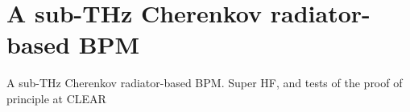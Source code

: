 \chapter[A sub-THz Cherenkov radiator-based BPM]{A sub-THz Cherenkov radiator-based BPM}

A sub-THz Cherenkov radiator-based BPM. Super HF, and tests of the proof of principle at CLEAR
